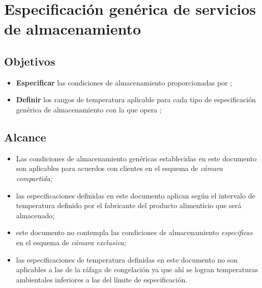 \renewcommand{\MayorVer}{2}
\renewcommand{\MenorVer}{1}
\renewcommand{\Codigo}{PSA-9-ESP} %
\renewcommand{\FechaPub}{2023--01}
\renewcommand{\Titulo}{Especificación genérica de servicios de almacenamiento}

\section{\Titulo}
\label{esp:generica}

\subsection{Objetivos}

\begin{itemize}
	\item \textbf{Especificar} las condiciones de almacenamiento proporcionadas por ;
	\item \textbf{Definir} los rangos de temperatura aplicable para cada tipo de especificación genérica de almacenamiento con la que opera ;
\end{itemize}

\subsection{Alcance}

\begin{itemize}
	\item Las condiciones de almacenamiento genéricas establecidas en este documento son aplicables para acuerdos con clientes en el esquema de \emph{cámara compartida;}
	\item las especificaciones definidas en este documento aplican según el intervalo de temperatura definido por el fabricante del producto alimenticio que será almacenado;
	\item este documento no contempla las condiciones de almacenamiento \emph{especificas} en el esquema de \emph{cámara exclusiva;}
	\item las especificaciones de temperatura definidas en este documento no son aplicables a las de la ráfaga de congelación ya que ahí se logran temperaturas ambientales inferiores a las del límite de especificación.
\end{itemize}

